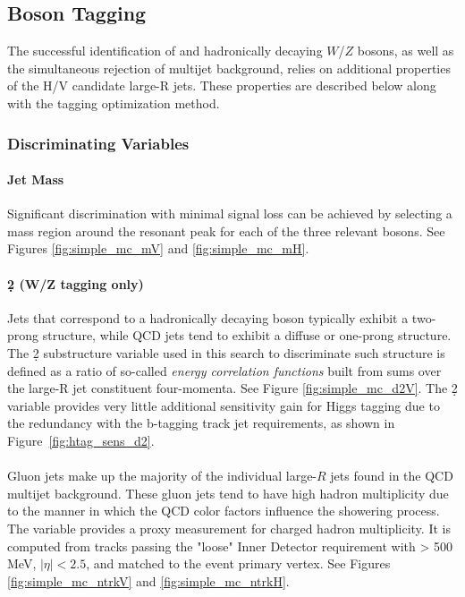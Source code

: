 \subsection{Boson Tagging}

The successful identification of \Hbb and hadronically decaying $W$/$Z$ bosons, as well as the simultaneous rejection of multijet background, relies on additional properties of the H/V candidate large-R jets. These properties are described below along with the tagging optimization method.

\subsubsection{Discriminating Variables}

\paragraph{Jet Mass}
Significant discrimination with minimal signal loss can be achieved by selecting a mass region around the resonant peak for each of the three relevant bosons.
See Figures \ref{fig:simple_mc_mV} and \ref{fig:simple_mc_mH}.

\paragraph{\d2 (W/Z tagging only)}
Jets that correspond to a hadronically decaying boson typically exhibit a two-prong structure, while QCD jets tend to exhibit a diffuse or one-prong structure.
The \d2 substructure variable used in this search to discriminate such structure is defined as a ratio of so-called \textit{energy correlation functions} \cite{Larkoski:2013eya} built from sums over the large-R jet constituent four-momenta.
See Figure \ref{fig:simple_mc_d2V}.
The \d2 variable provides very little additional sensitivity gain for Higgs tagging due to the redundancy with the b-tagging track jet requirements, as shown in Figure~\ref{fig:htag_sens_d2}.

\paragraph{\ntrk}
Gluon jets make up the majority of the individual large-$R$ jets found in the QCD multijet background.
These gluon jets tend to have high hadron multiplicity due to the manner in which the QCD color factors influence the showering process.
The \ntrk variable provides a proxy measurement for charged hadron multiplicity.
It is computed from tracks passing the "loose" Inner Detector requirement with \pt > 500 MeV, $|\eta| < 2.5$, and matched to the event primary vertex.
See Figures \ref{fig:simple_mc_ntrkV} and \ref{fig:simple_mc_ntrkH}.

